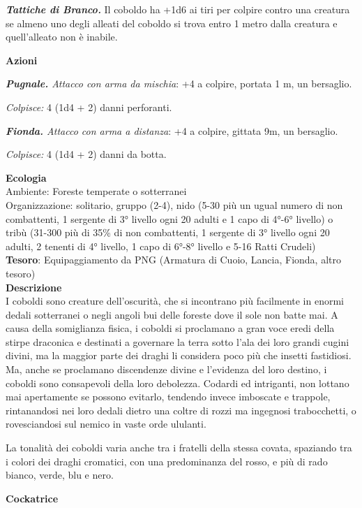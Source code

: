 \begin{multicols}{2}
\textit{\textbf{Tattiche di Branco.}} Il coboldo ha +1d6 ai tiri per colpire contro una creatura se almeno uno degli alleati del coboldo si trova entro 1 metro dalla creatura e quell'alleato non è inabile.

\textbf{Azioni}

\textit{\textbf{Pugnale.} Attacco con arma da mischia}: +4 a colpire, portata 1 m, un bersaglio.

\textit{Colpisce:} 4 (1d4 + 2) danni perforanti.

\textit{\textbf{Fionda.} Attacco con arma a distanza}: +4 a colpire, gittata 9m, un bersaglio.

\textit{Colpisce:} 4 (1d4 + 2) danni da botta.

\textbf{Ecologia}\\
Ambiente: Foreste temperate o sotterranei\\
Organizzazione: solitario, gruppo (2-4), nido (5-30 più un ugual numero di non combattenti, 1 sergente di 3° livello ogni 20 adulti e 1 capo di 4°-6° livello) o tribù (31-300 più di 35\% di non combattenti, 1 sergente di 3° livello ogni 20 adulti, 2 tenenti di 4° livello, 1 capo di 6°-8° livello e 5-16 Ratti Crudeli)\\
\textbf{Tesoro}: Equipaggiamento da PNG (Armatura di Cuoio, Lancia, Fionda, altro tesoro)\\
\textbf{Descrizione}\\
I coboldi sono creature dell'oscurità, che si incontrano più facilmente in enormi dedali sotterranei o negli angoli bui delle foreste dove il sole non batte mai. A causa della somiglianza fisica, i coboldi si proclamano a gran voce eredi della stirpe draconica e destinati a governare la terra sotto l'ala dei loro grandi cugini divini, ma la maggior parte dei draghi li considera poco più che insetti fastidiosi. Ma, anche se proclamano discendenze divine e l'evidenza del loro destino, i coboldi sono consapevoli della loro debolezza. Codardi ed intriganti, non lottano mai apertamente se possono evitarlo, tendendo invece imboscate e trappole, rintanandosi nei loro dedali dietro una coltre di rozzi ma ingegnosi trabocchetti, o rovesciandosi sul nemico in vaste orde ululanti.

La tonalità dei coboldi varia anche tra i fratelli della stessa covata, spaziando tra i colori dei draghi cromatici, con una predominanza del rosso, e più di rado bianco, verde, blu e nero.

\medskip{}\textbf{Cockatrice}


\end{multicols}
